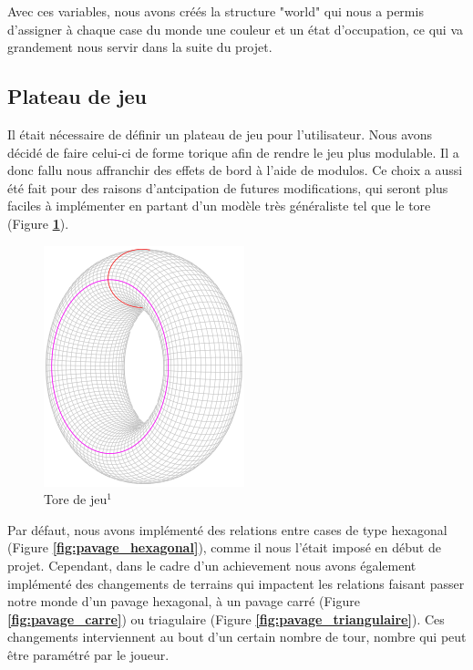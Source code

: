         \noindent Avec ces variables, nous avons créés la structure "world" qui nous a permis d'assigner à chaque case du monde une couleur et un état d'occupation, ce qui va grandement nous servir dans la suite du projet.
        
    \subsection{Plateau de jeu}\label{part:geometry}
        Il était nécessaire de définir un plateau de jeu pour l'utilisateur. Nous avons décidé de faire celui-ci de forme torique afin de rendre le jeu plus modulable. Il a donc fallu nous affranchir des effets de bord à l'aide de modulos. Ce choix a aussi été fait pour des raisons d'antcipation de futures modifications, qui seront plus faciles à implémenter en partant d'un modèle très généraliste tel que le tore (Figure \textbf{\ref{fig:tore_de_jeu}}).
        \medbreak
        
        \begin{figure}[H]
            \centering
            \includegraphics[scale=0.4]{tor.png}
            \caption{Tore de jeu$^1$}
            \label{fig:tore_de_jeu}
        \end{figure}
        
        Par défaut, nous avons implémenté des relations entre cases de type hexagonal (Figure \textbf{\ref{fig:pavage_hexagonal}}), comme il nous l'était imposé en début de projet. Cependant, dans le cadre d'un achievement nous avons également implémenté des changements de terrains qui impactent les relations faisant passer notre monde d'un pavage hexagonal, à un pavage carré (Figure \textbf{\ref{fig:pavage_carre}}) ou triagulaire (Figure \textbf{\ref{fig:pavage_triangulaire}}). Ces changements interviennent au bout d'un certain nombre de tour, nombre qui peut être paramétré par le joueur.
        
